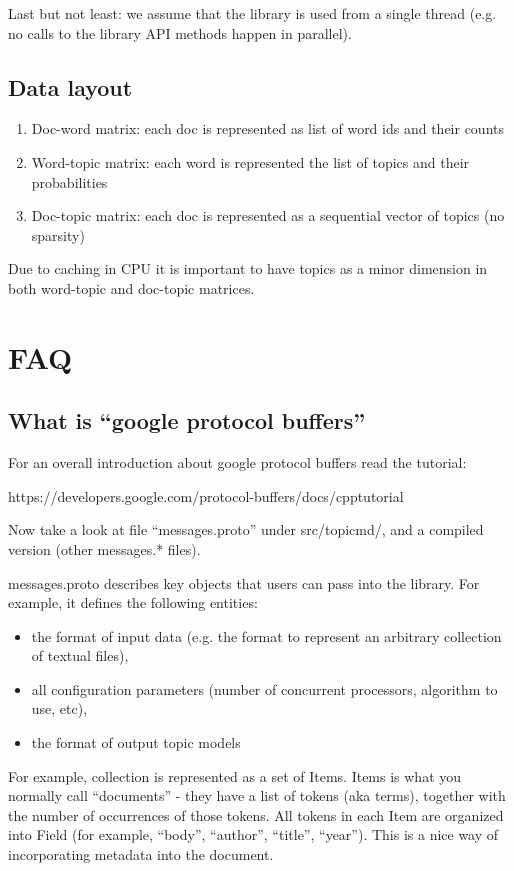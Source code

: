 \documentclass[11pt,a4paper,twoside]{report}
\begin{document}
Last but not least:
we assume that the library is used from a single thread
(e.g. no calls to the library API methods happen in parallel).

\subsection{Data layout}
\begin{enumerate}
    \item Doc-word matrix: each doc is represented as list of word ids and their counts
    \item Word-topic matrix: each word is represented the list of topics and their probabilities
    \item Doc-topic matrix: each doc is represented as a sequential vector of topics (no sparsity)
\end{enumerate}

Due to caching in CPU it is important to have topics as a minor dimension in both word-topic and doc-topic matrices.

\section{FAQ}

\subsection{What is ``google protocol buffers''}

For an overall introduction about google protocol buffers read the tutorial:

https://developers.google.com/protocol-buffers/docs/cpptutorial

Now take a look at file ``messages.proto'' under src/topicmd/,
and a compiled version (other messages.* files).

messages.proto describes key objects that users can pass into the library.
For example, it defines the following entities:
\begin{itemize}
    \item the format of input data
        (e.g. the format to represent an arbitrary collection of textual files),
    \item all configuration parameters (number of concurrent processors, algorithm to use, etc),
    \item the format of output topic models
 \end{itemize}

For example, collection is represented as a set of Items.
Items is what you normally call ``documents'' - they have a list of tokens (aka terms),
together with the number of occurrences of those tokens.
All tokens in each Item are organized into Field (for example, ``body'', ``author'', ``title'', ``year'').
This is a nice way of incorporating metadata into the document.
\end{document}
